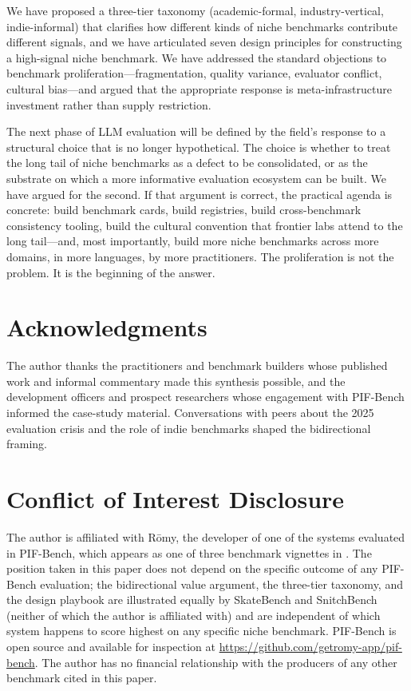 \documentclass[11pt,a4paper]{article}
\begin{document}
We have proposed a three-tier taxonomy (academic-formal, industry-vertical, indie-informal) that clarifies how different kinds of niche benchmarks contribute different signals, and we have articulated seven design principles for constructing a high-signal niche benchmark. We have addressed the standard objections to benchmark proliferation---fragmentation, quality variance, evaluator conflict, cultural bias---and argued that the appropriate response is meta-infrastructure investment rather than supply restriction.

The next phase of LLM evaluation will be defined by the field's response to a structural choice that is no longer hypothetical. The choice is whether to treat the long tail of niche benchmarks as a defect to be consolidated, or as the substrate on which a more informative evaluation ecosystem can be built. We have argued for the second. If that argument is correct, the practical agenda is concrete: build benchmark cards, build registries, build cross-benchmark consistency tooling, build the cultural convention that frontier labs attend to the long tail---and, most importantly, build more niche benchmarks across more domains, in more languages, by more practitioners. The proliferation is not the problem. It is the beginning of the answer.

\section*{Acknowledgments}

The author thanks the practitioners and benchmark builders whose published work and informal commentary made this synthesis possible, and the development officers and prospect researchers whose engagement with PIF-Bench informed the case-study material. Conversations with peers about the 2025 evaluation crisis and the role of indie benchmarks shaped the bidirectional framing.

\section*{Conflict of Interest Disclosure}

The author is affiliated with R\={o}my, the developer of one of the systems evaluated in PIF-Bench, which appears as one of three benchmark vignettes in . The position taken in this paper does not depend on the specific outcome of any PIF-Bench evaluation; the bidirectional value argument, the three-tier taxonomy, and the design playbook are illustrated equally by SkateBench and SnitchBench (neither of which the author is affiliated with) and are independent of which system happens to score highest on any specific niche benchmark. PIF-Bench is open source and available for inspection at \url{https://github.com/getromy-app/pif-bench}. The author has no financial relationship with the producers of any other benchmark cited in this paper.
\end{document}
